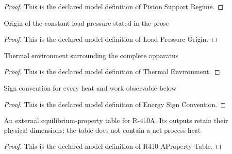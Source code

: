 \begin{proof}
  This is the declared model definition of Piston Support Regime.
\end{proof}
\begin{definition}
  \label{def:physics:phyx-mini-0462:phyxminiproblems-problemphyxmini0462-loadpressureorigin}
  Origin of the constant load pressure stated in the prose
\end{definition}
\begin{proof}
  This is the declared model definition of Load Pressure Origin.
\end{proof}
\begin{definition}
  \label{def:physics:phyx-mini-0462:phyxminiproblems-problemphyxmini0462-thermalenvironment}
  Thermal environment surrounding the complete apparatus
\end{definition}
\begin{proof}
  This is the declared model definition of Thermal Environment.
\end{proof}
\begin{definition}
  \label{def:physics:phyx-mini-0462:phyxminiproblems-problemphyxmini0462-energysignconvention}
  Sign convention for every heat and work observable below
\end{definition}
\begin{proof}
  This is the declared model definition of Energy Sign Convention.
\end{proof}
\begin{definition}
  \label{def:physics:phyx-mini-0462:phyxminiproblems-problemphyxmini0462-r410apropertytable}
  An external equilibrium-property table for R-410A. Its outputs retain their physical dimensions; the table does not contain a net process heat
\end{definition}
\begin{proof}
  This is the declared model definition of R410 AProperty Table.
\end{proof}

